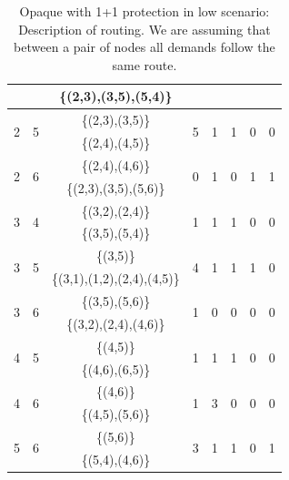\begin{table}[h!]
\begin{tabular}{|| c | c | c | c | c | c | c | c ||}
 & & \{(2,3),(3,5),(5,4)\} & & & & &\\ \hline
 \multirow{2}{*}{2} & \multirow{2}{*}{5} & \{(2,3),(3,5)\} & \multirow{2}{*}{5} & \multirow{2}{*}{1} & \multirow{2}{*}{1} & \multirow{2}{*}{0} & \multirow{2}{*}{0}\\
 & & \{(2,4),(4,5)\} & & & & &\\ \hline
 \multirow{2}{*}{2} & \multirow{2}{*}{6} & \{(2,4),(4,6)\} & \multirow{2}{*}{0} & \multirow{2}{*}{1} & \multirow{2}{*}{0} & \multirow{2}{*}{1} & \multirow{2}{*}{1}\\
 & & \{(2,3),(3,5),(5,6)\} & & & & &\\ \hline
 \multirow{2}{*}{3} & \multirow{2}{*}{4} & \{(3,2),(2,4)\} & \multirow{2}{*}{1} & \multirow{2}{*}{1} & \multirow{2}{*}{1} & \multirow{2}{*}{0} & \multirow{2}{*}{0}\\
 & & \{(3,5),(5,4)\} & & & & &\\ \hline
 \multirow{2}{*}{3} & \multirow{2}{*}{5} & \{(3,5)\} & \multirow{2}{*}{4} & \multirow{2}{*}{1} & \multirow{2}{*}{1} & \multirow{2}{*}{1} & \multirow{2}{*}{0}\\
 & & \{(3,1),(1,2),(2,4),(4,5)\} & & & & &\\ \hline
 \multirow{2}{*}{3} & \multirow{2}{*}{6} & \{(3,5),(5,6)\} & \multirow{2}{*}{1} & \multirow{2}{*}{0} & \multirow{2}{*}{0} & \multirow{2}{*}{0} & \multirow{2}{*}{0}\\
 & & \{(3,2),(2,4),(4,6)\} & & & & &\\ \hline
 \multirow{2}{*}{4} & \multirow{2}{*}{5} & \{(4,5)\} & \multirow{2}{*}{1} & \multirow{2}{*}{1} & \multirow{2}{*}{1} & \multirow{2}{*}{0} & \multirow{2}{*}{0}\\
 & & \{(4,6),(6,5)\} & & & & &\\ \hline
 \multirow{2}{*}{4} & \multirow{2}{*}{6} & \{(4,6)\} & \multirow{2}{*}{1} & \multirow{2}{*}{3} & \multirow{2}{*}{0} & \multirow{2}{*}{0} & \multirow{2}{*}{0}\\
 & & \{(4,5),(5,6)\} & & & & &\\ \hline
 \multirow{2}{*}{5} & \multirow{2}{*}{6} & \{(5,6)\} & \multirow{2}{*}{3} & \multirow{2}{*}{1} & \multirow{2}{*}{1} & \multirow{2}{*}{0} & \multirow{2}{*}{1}\\
 & & \{(5,4),(4,6)\} & & & & &\\
 \hline
\end{tabular}
\caption{Opaque with 1+1 protection in low scenario: Description of routing. We are assuming that between a pair of nodes all demands follow the same route.}
\label{path_opaque_protec_ref_low}
\end{table}

